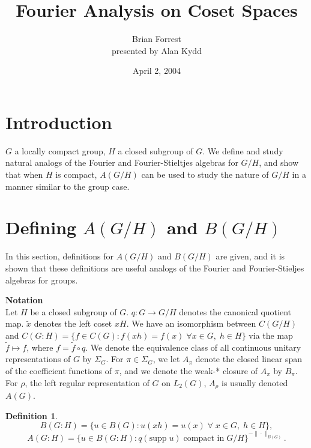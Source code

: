 \documentclass[12 pt]{article}
\title{Fourier Analysis on Coset Spaces}
\author{Brian Forrest\\presented by Alan Kydd}
\date{April 2, 2004}
\newtheorem{defn}{Definition}
\begin{document}
\maketitle

\section{Introduction}

$G$ a locally compact group, $H$ a closed subgroup of $G$.  We define and study
natural analogs of the Fourier and Fourier-Stieltjes algebras for $G/H$, and show
that when $H$ is compact, $A(G/H)$ can be used to study the nature of $G/H$ in a manner
similar to the group case.


\section{Defining $A(G/H)$ and $B(G/H)$}
In this section, definitions for $A(G/H)$ and $B(G/H)$ are given, and it is shown
that these definitions are useful analogs of the Fourier and Fourier-Stieljes algebras
for groups.

\bigskip
\noindent\textbf{Notation}\\
Let $H$ be a closed subgroup of $G$.  $q : G \rightarrow G/H$ denotes the canonical quotient map.
$\tilde{x}$ denotes the left coset $xH$.  We have an isomorphism between
$C(G/H)$ and $C(G:H)= \{f\in C(G):f(xh) = f(x)\;\forall x\in G,\;h\in H\}$
via the map $\tilde{f} \mapsto f$, where $f = \tilde{f}\circ q$.
We denote the equivalence class of all continuous unitary
representations of $G$ by $\Sigma_G$.  For $\pi \in \Sigma_G$, we let $A_\pi$ denote the closed linear
span of the coefficient functions of $\pi$, and we denote the weak-* closure of $A_\pi$ by $B_\pi$.
For $\rho$, the left regular representation of $G$ on $L_2 (G)$, $A_\rho$ is usually denoted $A(G)$.

\begin{defn}
$$B(G:H) = \{u\in B(G):u(xh) = u(x)\;\forall\;x\in G,\;h \in H\},$$
$$A(G:H) = \{u\in B(G:H): q(\text{supp}\;u)\;\text{compact in}\;G/H\}^{-\|\cdot\|_{B(G)}}.$$
\end{defn}
\end{document}
